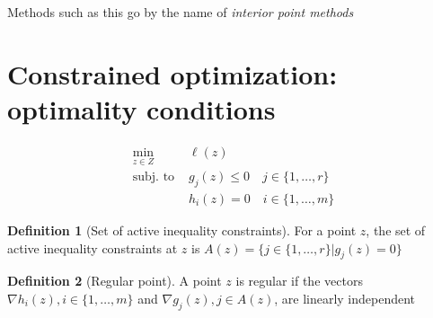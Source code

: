 \documentclass[openany]{book}
\theoremstyle{definition}
\newtheorem{definition}{Definition}[section] %
\theoremstyle{remark}
\begin{document}
Methods such as this go by the name of \emph{interior point methods}

\section{Constrained optimization: optimality conditions}

\begin{align*}
    \min_{z\in Z}\  &\ell(z)\\
    \text{subj. to } & g_j(z)\leq 0 \quad j\in\{1,\dots,r\}\\
    & h_i(z)=0 \quad i\in\{1,\dots,m\}
\end{align*}

\begin{definition}[Set of active inequality constraints]
    For a point $z$, the set of active inequality constraints at $z$ is $A(z) = \{j\in\{1,\dots,r\}|g_j(z)=0\}$
\end{definition}
\begin{definition}[Regular point]
    A point $z$ is regular if the vectors $\nabla h_i(z), i\in \{1,\dots,m\}$ and $\nabla g_j(z), j\in A(z)$, are linearly independent
\end{definition}
\end{document}
